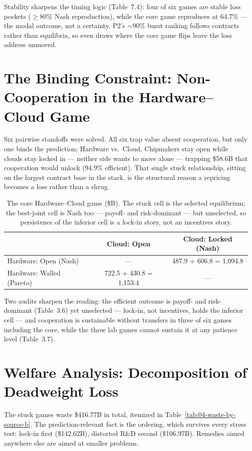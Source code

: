 \documentclass[11pt,a4paper]{article}
\begin{document}
Stability sharpens the timing logic (Table~7.4): four of six games are
stable loss pockets ($\geq$80\% Nash reproduction), while the core game
reproduces at 64.7\% --- the modal outcome, not a certainty. P2's
$\sim$90\% burst ranking follows contracts rather than equilibria, so even
draws where the core game flips leave the loss address unmoved.

\section{The Binding Constraint: Non-Cooperation in the Hardware--Cloud Game}\label{sec:core}
Six pairwise standoffs were solved. All six trap value absent cooperation,
but only one binds the prediction: Hardware vs.\ Cloud. Chipmakers stay
open while clouds stay locked
in --- neither side wants to move alone --- trapping \$58.6B that
cooperation would unlock (94.9\% efficient). That single stuck relationship,
sitting on the largest contract base in the stack, is the structural reason
a repricing becomes a loss rather than a shrug.

\begin{table}[htbp]
\centering
\caption{The core Hardware--Cloud game (\$B). The stuck cell is the selected equilibrium; the best-joint cell is Nash too --- payoff- and risk-dominant --- but unselected, so persistence of the inferior cell is a lock-in story, not an incentives story.}
    \label{tab:03-the-core-hardwarecloud-game}
\begin{tabular}{lcc}
\toprule
 & Cloud: Open & Cloud: Locked (Nash) \\
\midrule
Hardware: Open (Nash) & --- & 487.9 + 606.8 = 1,094.8 \\
Hardware: Walled (Pareto) & 722.5 + 430.8 = 1,153.4 & --- \\
\bottomrule
\end{tabular}
\end{table}


Two audits sharpen the reading: the efficient outcome is payoff- and
risk-dominant (Table~3.6) yet unselected --- lock-in, not incentives, holds
the inferior cell --- and cooperation is sustainable without transfers in
three of six games including the core, while the three lab games cannot
sustain it at any patience level (Table~3.7).

\section{Welfare Analysis: Decomposition of Deadweight Loss}\label{sec:welfare}
The stuck games waste \$416.77B in total, itemized in Table~\ref{tab:04-waste-by-source-b}.
The prediction-relevant fact is the ordering, which survives every stress test:
lock-in first (\$142.62B), distorted R\&D second (\$106.97B). Remedies aimed
anywhere else are aimed at smaller problems.
\end{document}
